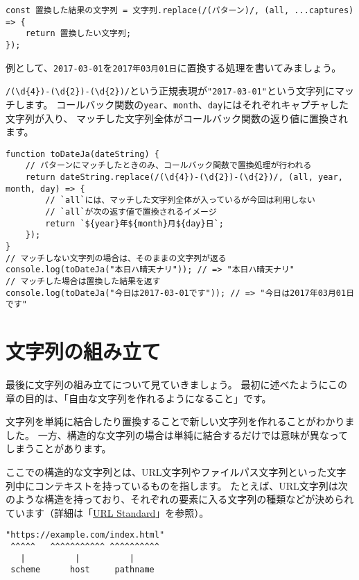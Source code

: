 \begin{lstlisting}
const 置換した結果の文字列 = 文字列.replace(/(パターン)/, (all, ...captures) => {
    return 置換したい文字列;
});
\end{lstlisting}

例として、\texttt{2017-03-01}を\texttt{2017年03月01日}に置換する処理を書いてみましょう。

\texttt{/(\textbackslash d\{4\})-(\textbackslash d\{2\})-(\textbackslash d\{2\})/}という正規表現が\texttt{"2017-03-01"}という文字列にマッチします。
コールバック関数の\texttt{year}、\texttt{month}、\texttt{day}にはそれぞれキャプチャした文字列が入り、
マッチした文字列全体がコールバック関数の返り値に置換されます。

\begin{lstlisting}
function toDateJa(dateString) {
    // パターンにマッチしたときのみ、コールバック関数で置換処理が行われる
    return dateString.replace(/(\d{4})-(\d{2})-(\d{2})/, (all, year, month, day) => {
        // `all`には、マッチした文字列全体が入っているが今回は利用しない
        // `all`が次の返す値で置換されるイメージ
        return `${year}年${month}月${day}日`;
    });
}
// マッチしない文字列の場合は、そのままの文字列が返る
console.log(toDateJa("本日ハ晴天ナリ")); // => "本日ハ晴天ナリ"
// マッチした場合は置換した結果を返す
console.log(toDateJa("今日は2017-03-01です")); // => "今日は2017年03月01日です"
\end{lstlisting}

\hypertarget{built}{%
\section{文字列の組み立て}\label{built}}

最後に文字列の組み立てについて見ていきましょう。
最初に述べたようにこの章の目的は、「自由な文字列を作れるようになること」です。

文字列を単純に結合したり置換することで新しい文字列を作れることがわかりました。
一方、構造的な文字列の場合は単純に結合するだけでは意味が異なってしまうことがあります。

ここでの構造的な文字列とは、URL文字列やファイルパス文字列といった文字列中にコンテキストを持っているものを指します。
たとえば、URL文字列は次のような構造を持っており、それぞれの要素に入る文字列の種類などが決められています（詳細は「\href{https://url.spec.whatwg.org/}{URL
Standard}」を参照）。

\begin{lstlisting}
"https://example.com/index.html"
 ^^^^^   ^^^^^^^^^^^ ^^^^^^^^^^   
   |          |     　　　|
 scheme      host     pathname
\end{lstlisting}

